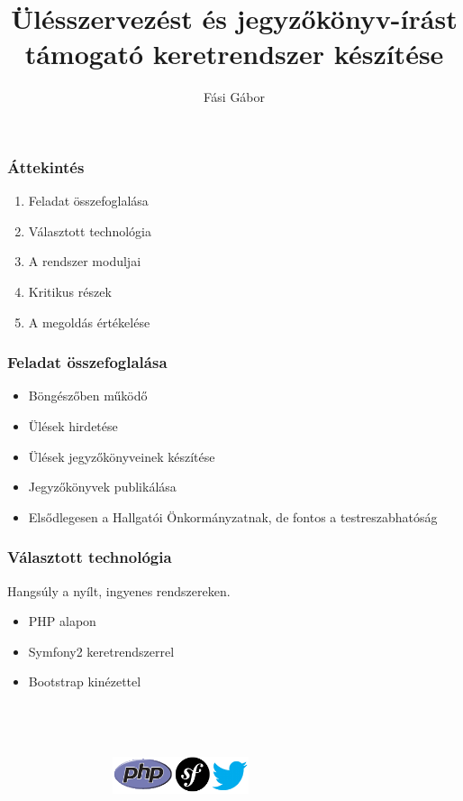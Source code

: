 \documentclass[12pt]{beamer}
\title[Ülésszervezést és jk.-írást támogató kr. készítése\hspace{4em}\insertframenumber/\inserttotalframenumber]{Ülésszervezést és jegyzőkönyv-írást támogató keretrendszer készítése}
\author{Fási Gábor}
\institute{Témavezető: Dulai Tibor}
\date{}
\begin{document}
\frame{\titlepage}

\begin{frame}
    \frametitle{Áttekintés}
    \Large
    \begin{enumerate}
        \item Feladat összefoglalása
        \item Választott technológia
        \item A rendszer moduljai
        \item Kritikus részek
        \item A megoldás értékelése
    \end{enumerate}
\end{frame}

\begin{frame}
    \frametitle{Feladat összefoglalása}
    
    \Large
    \begin{itemize}
	    \item Böngészőben működő
	    \item Ülések hirdetése
	    \item Ülések jegyzőkönyveinek készítése
	    \item Jegyzőkönyvek publikálása
	    \item Elsődlegesen a Hallgatói Önkormányzatnak, de fontos a testreszabhatóság
    \end{itemize}
\end{frame}

\begin{frame}
    \frametitle{Választott technológia}

    \Large
    Hangsúly a nyílt, ingyenes rendszereken.
    
    \begin{itemize}
        \item PHP alapon
        \item Symfony2 keretrendszerrel
        \item Bootstrap kinézettel
    \end{itemize}
~\\~\\~\\~
    ~~~~~~~~~~~~~~~\includegraphics[center,width=0.3\textwidth,center]{logok.png}
\end{frame}
\end{document}
